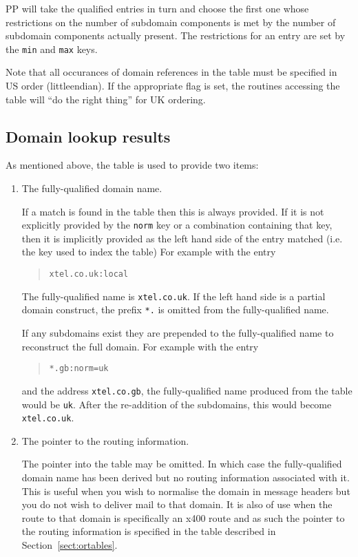 PP will take the qualified entries in turn and choose the first one
whose restrictions on the number of subdomain components is met by the
number of subdomain components actually present.
The restrictions for an entry are set by the \verb+min+ and \verb+max+ keys.

Note that all occurances of domain references in the
 table must be specified in US order (littleendian).
If the appropriate flag is set, the routines accessing the
 table will ``do the right thing'' for UK ordering.

\subsection*{Domain lookup results}

As mentioned above, the  table is used to provide two
items:
\begin{enumerate}
\item	The fully-qualified domain name.

If a match is found in the table then this is always provided.
If it is not explicitly provided by the \verb+norm+ key or a
combination containing that key, then it is implicitly provided as the
left hand side of the entry matched (i.e. the key used to index the
 table)
For example with the entry
\begin{quote}\begin{verbatim}
xtel.co.uk:local
\end{verbatim}\end{quote}
The fully-qualified name is \verb+xtel.co.uk+.
If the left hand side is a partial domain construct, the prefix
\verb+*.+ is omitted from the fully-qualified name.

If any subdomains exist they are prepended to the fully-qualified name
to reconstruct the full domain.
For example with the entry
\begin{quote}\begin{verbatim}
*.gb:norm=uk
\end{verbatim}\end{quote}
and the address \verb+xtel.co.gb+, the fully-qualified name produced
from the table would be \verb+uk+.
After the re-addition of the subdomains, this would become
\verb+xtel.co.uk+.

\item	The pointer to the routing information.

The pointer into the  table may be omitted.
In which case the fully-qualified domain name has been derived but no
routing information associated with it.
This is useful when you wish to normalise the domain in message
headers but you do not wish to deliver mail to that domain.
It is also of use when the route to that domain is specifically an
x400 route and as such the pointer to the routing information is
specified in the  table described in
Section~\ref{sect:ortables}.

\end{enumerate}

